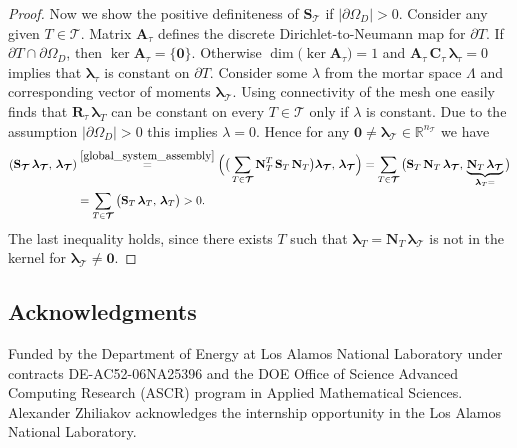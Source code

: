 \documentclass[12pt]{article}
\newcommand{\vect}[1]{\boldsymbol{\mathbf{#1}}}
\newcommand{\bcell}{T}
\newcommand{\bmesh}{{\vect{\mathcal T}}}
\newcommand{\mmesh}{{\vect{\mathcal \tau}}}
\DeclareMathOperator{\Ker}{ker}
\DeclareMathOperator{\Dim}{dim}
\begin{document}
\begin{proof}
		Now we show the positive definiteness of $\vect S_\bmesh$ if $|\partial\Omega_D|>0 $. Consider  any given $\bcell\in\bmesh$.
		Matrix  $\vect A_{\mmesh}$ defines the discrete Dirichlet-to-Neumann map for $\partial\bcell$.
		If $\partial\bcell\cap\partial\Omega_D$, then $\Ker \vect A_{\mmesh} = \{\vect 0\}$. Otherwise $\Dim\big(\Ker \vect A_{\mmesh}\big) = 1$ and $\vect A_{\mmesh}\,\vect C_{\mmesh}\,\vect\lambda_\mmesh=0$ implies that $\vect\lambda_\mmesh$ is constant on $\partial\bcell$. Consider some $\lambda$ from the mortar space $\Lambda$ and corresponding vector of moments  $\vect \lambda_\bmesh$. Using connectivity of the mesh one easily finds that $\vect R_\mmesh\,\vect\lambda_\bcell$ can be constant on every $T\in\bmesh$ only if $\lambda$ is constant. Due to the assumption $|\partial\Omega_D|>0$ this implies $\lambda=0$.
		Hence for any $\vect0\neq\vect\lambda_\bmesh\in \mathbb{R}^{n_\bmesh}$ we have
		\begin{align*}
		\left(\vect S_\bmesh\,\vect\lambda_\bmesh,\,\vect\lambda_\bmesh\right) &\stackrel{\eqref{global_system_assembly}}{=}
		\Big( \big( \sum_{\bcell \in \bmesh} \vect N^T_\bcell\,\vect S_\bcell\,\vect N_\bcell \big){\vect\lambda_\bmesh},\,{\vect\lambda_\bmesh} \Big) =
		\sum_{\bcell \in \bmesh} \big( \vect S_\bcell\,\vect N_\bcell\,{\vect\lambda_\bmesh},\,\underbrace{\vect N_\bcell\,{\vect\lambda_\bmesh}}_{{\vect \lambda_\bcell} =} \big) \\
		& = \sum_{\bcell \in \bmesh} \big(\vect S_\bcell\,{\vect \lambda_\bcell},\,{\vect \lambda_\bcell} \big) > 0.
		\end{align*}
		The last inequality holds, since there exists $\bcell$ such that $\vect \lambda_\bcell=\vect N_\bcell\,{\vect\lambda_\bmesh}$ is not in the kernel for $\vect\lambda_\bmesh\neq\vect0$.
	\end{proof}

	
	
	\subsection*{Acknowledgments}
        Funded by the Department of Energy at Los Alamos National Laboratory
        under contracts DE-AC52-06NA25396 and the DOE Office of Science
        Advanced Computing Research (ASCR) program in Applied Mathematical
        Sciences. Alexander Zhiliakov acknowledges the internship opportunity in the Los Alamos National Laboratory.
	
	
	
\end{document}
